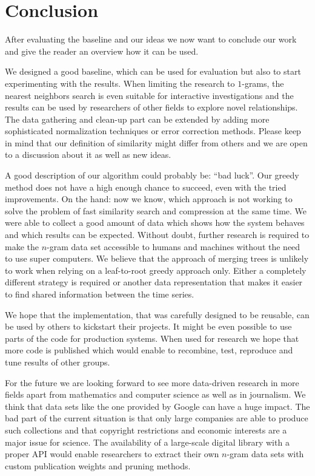 \chapter{Conclusion}
\label{ch:Conclusion}

After evaluating the baseline and our ideas we now want to conclude our work and give the reader an overview how it can be used.

We designed a good baseline, which can be used for evaluation but also to start experimenting with the results. When limiting the research to $1$-grams, the nearest neighbors search is even suitable for interactive investigations and the results can be used by researchers of other fields to explore novel relationships. The data gathering and clean-up part can be extended by adding more sophisticated normalization techniques or error correction methods. Please keep in mind that our definition of similarity might differ from others and we are open to a discussion about it as well as new ideas.

A good description of our algorithm could probably be: \enquote{bad luck}. Our greedy method does not have a high enough chance to succeed, even with the tried improvements. On the hand: now we know, which approach is not working to solve the problem of fast similarity search and compression at the same time. We were able to collect a good amount of data which shows how the system behaves and which results can be expected. Without doubt, further research is required to make the $n$-gram data set accessible to humans and machines without the need to use super computers. We believe that the approach of merging trees is unlikely to work when relying on a leaf-to-root greedy approach only. Either a completely different strategy is required or another data representation that makes it easier to find shared information between the time series.

We hope that the implementation, that was carefully designed to be reusable, can be used by others to kickstart their projects. It might be even possible to use parts of the code for production systems. When used for research we hope that more code is published which would enable to recombine, test, reproduce and tune results of other groups.

For the future we are looking forward to see more data-driven research in more fields apart from mathematics and computer science as well as in journalism. We think that data sets like the one provided by Google can have a huge impact. The bad part of the current situation is that only large companies are able to produce such collections and that copyright restrictions and economic interests are a major issue for science. The availability of a large-scale digital library with a proper API would enable researchers to extract their own $n$-gram data sets with custom publication weights and pruning methods.

